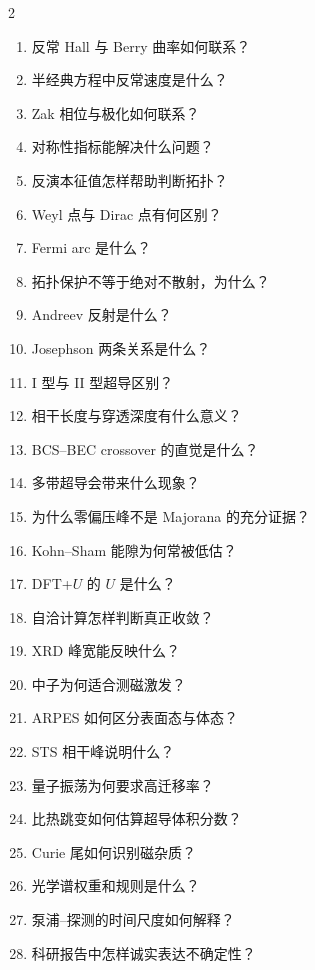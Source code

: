 \begin{multicols}{2}
\begin{enumerate}
\item 反常 Hall 与 Berry 曲率如何联系？
\item 半经典方程中反常速度是什么？
\item Zak 相位与极化如何联系？
\item 对称性指标能解决什么问题？
\item 反演本征值怎样帮助判断拓扑？
\item Weyl 点与 Dirac 点有何区别？
\item Fermi arc 是什么？
\item 拓扑保护不等于绝对不散射，为什么？
\item Andreev 反射是什么？
\item Josephson 两条关系是什么？
\item I 型与 II 型超导区别？
\item 相干长度与穿透深度有什么意义？
\item BCS--BEC crossover 的直觉是什么？
\item 多带超导会带来什么现象？
\item 为什么零偏压峰不是 Majorana 的充分证据？
\item Kohn--Sham 能隙为何常被低估？
\item DFT+$U$ 的 $U$ 是什么？
\item 自洽计算怎样判断真正收敛？
\item XRD 峰宽能反映什么？
\item 中子为何适合测磁激发？
\item ARPES 如何区分表面态与体态？
\item STS 相干峰说明什么？
\item 量子振荡为何要求高迁移率？
\item 比热跳变如何估算超导体积分数？
\item Curie 尾如何识别磁杂质？
\item 光学谱权重和规则是什么？
\item 泵浦--探测的时间尺度如何解释？
\item 科研报告中怎样诚实表达不确定性？
\end{enumerate}
\end{multicols}

